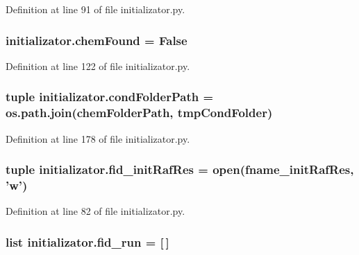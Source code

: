 Definition at line 91 of file initializator.\-py.

\hypertarget{a00135_acdd521d6bd1a71be37421dafd210de99}{
\subsubsection[{chem\-Found}]{\setlength{\rightskip}{0pt plus 5cm}initializator.\-chem\-Found = False}}\label{a00135_acdd521d6bd1a71be37421dafd210de99}


Definition at line 122 of file initializator.\-py.

\hypertarget{a00135_a7fe46587523066ae019cbe755f63888a}{
\subsubsection[{cond\-Folder\-Path}]{\setlength{\rightskip}{0pt plus 5cm}tuple initializator.\-cond\-Folder\-Path = os.\-path.\-join({\bf chem\-Folder\-Path}, {\bf tmp\-Cond\-Folder})}}\label{a00135_a7fe46587523066ae019cbe755f63888a}


Definition at line 178 of file initializator.\-py.

\hypertarget{a00135_a2f15742bdb2c2cebe65c8e9730915e28}{
\subsubsection[{fid\-\_\-init\-Raf\-Res}]{\setlength{\rightskip}{0pt plus 5cm}tuple initializator.\-fid\-\_\-init\-Raf\-Res = open({\bf fname\-\_\-init\-Raf\-Res}, 'w')}}\label{a00135_a2f15742bdb2c2cebe65c8e9730915e28}


Definition at line 82 of file initializator.\-py.

\hypertarget{a00135_a6015a676cc06fdae98b1cca15d92b883}{
\subsubsection[{fid\-\_\-run}]{\setlength{\rightskip}{0pt plus 5cm}list initializator.\-fid\-\_\-run = \mbox{[}$\,$\mbox{]}}}\label{a00135_a6015a676cc06fdae98b1cca15d92b883}


